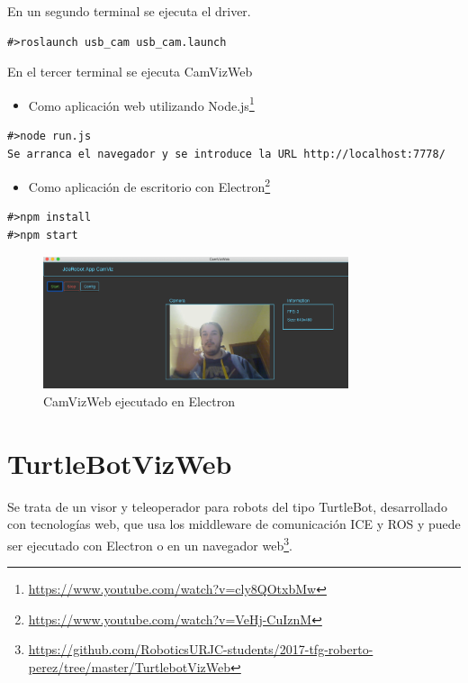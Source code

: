 En un segundo terminal se ejecuta el driver.

\begin{lstlisting}[caption= Ejecución del driver de ROS label=cod.driverusbcam]
#>roslaunch usb_cam usb_cam.launch
\end{lstlisting}

En el tercer terminal se ejecuta CamVizWeb

\begin{itemize}
\item 
Como aplicación web utilizando Node.js\footnote{\url{https://www.youtube.com/watch?v=cly8QOtxbMw}}
\end{itemize}

\begin{lstlisting}[caption= Ejecución con Node.js, label=cod.camviznodejs]
#>node run.js
Se arranca el navegador y se introduce la URL http://localhost:7778/
\end{lstlisting}

\begin{itemize}
\item 
Como aplicación de escritorio con Electron\footnote{\url{https://www.youtube.com/watch?v=VeHj-CuIznM}}
\end{itemize}

\begin{lstlisting}[caption= Ejecución con Electron, label=cod.camvizelectron]
#>npm install
#>npm start
\end{lstlisting}

\begin{figure}[H]
  \begin{center}
    \includegraphics[width=0.8\textwidth]{figures/camvizelectron.png}
    		\caption{CamVizWeb ejecutado en Electron}
		\label{fig.camvizelectron}
		\end{center}
\end{figure}

\section{TurtleBotVizWeb}
Se trata de un visor y teleoperador para robots del tipo TurtleBot, desarrollado con tecnologías web, que usa los middleware de comunicación ICE y ROS y puede ser ejecutado con Electron o en un navegador web\footnote{\url{https://github.com/RoboticsURJC-students/2017-tfg-roberto-perez/tree/master/TurtlebotVizWeb}}.

